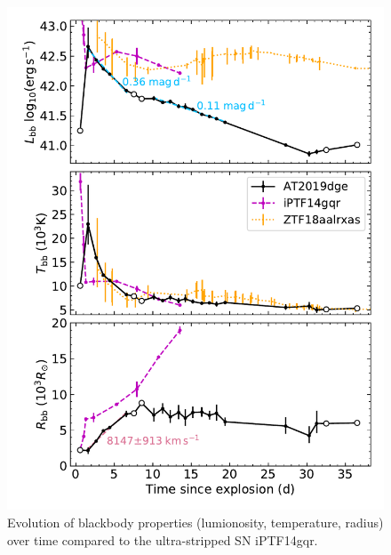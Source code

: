 \documentclass[twocolumn]{aastex63}
\begin{document}
\begin{CJK*}{UTF8}{gbsn}
\begin{figure}[!htbp] 
	\centering
	\includegraphics[width=\columnwidth]{figures/Tbb_Rbb.pdf}
	\caption{Evolution of blackbody properties (lumionosity, temperature, radius) over time compared to 
		the ultra-stripped SN iPTF14gqr.}
	\label{fig:Tbb_Rbb_Lbb}
\end{figure}


\end{CJK*}
\end{document}
